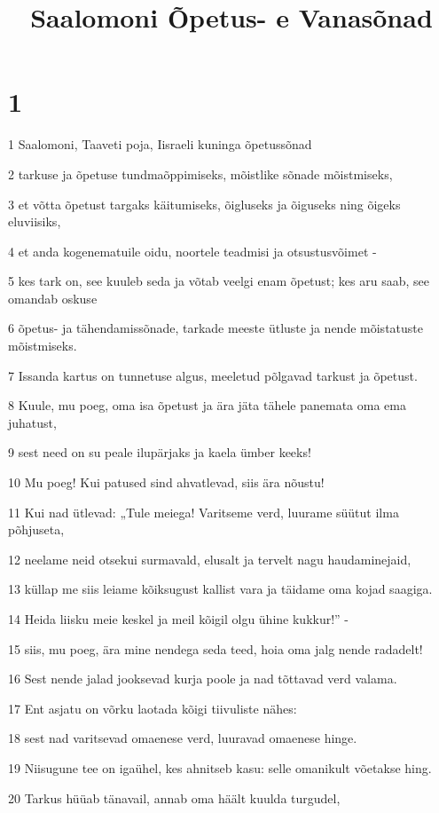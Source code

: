 

\title{Saalomoni Õpetus- e Vanasõnad}

\chapter{1}

\par 1 Saalomoni, Taaveti poja, Iisraeli kuninga õpetussõnad
\par 2 tarkuse ja õpetuse tundmaõppimiseks, mõistlike sõnade mõistmiseks,
\par 3 et võtta õpetust targaks käitumiseks, õigluseks ja õiguseks ning õigeks eluviisiks,
\par 4 et anda kogenematuile oidu, noortele teadmisi ja otsustusvõimet -
\par 5 kes tark on, see kuuleb seda ja võtab veelgi enam õpetust; kes aru saab, see omandab oskuse
\par 6 õpetus- ja tähendamissõnade, tarkade meeste ütluste ja nende mõistatuste mõistmiseks.
\par 7 Issanda kartus on tunnetuse algus, meeletud põlgavad tarkust ja õpetust.
\par 8 Kuule, mu poeg, oma isa õpetust ja ära jäta tähele panemata oma ema juhatust,
\par 9 sest need on su peale ilupärjaks ja kaela ümber keeks!
\par 10 Mu poeg! Kui patused sind ahvatlevad, siis ära nõustu!
\par 11 Kui nad ütlevad: „Tule meiega! Varitseme verd, luurame süütut ilma põhjuseta,
\par 12 neelame neid otsekui surmavald, elusalt ja tervelt nagu haudaminejaid,
\par 13 küllap me siis leiame kõiksugust kallist vara ja täidame oma kojad saagiga.
\par 14 Heida liisku meie keskel ja meil kõigil olgu ühine kukkur!” -
\par 15 siis, mu poeg, ära mine nendega seda teed, hoia oma jalg nende radadelt!
\par 16 Sest nende jalad jooksevad kurja poole ja nad tõttavad verd valama.
\par 17 Ent asjatu on võrku laotada kõigi tiivuliste nähes:
\par 18 sest nad varitsevad omaenese verd, luuravad omaenese hinge.
\par 19 Niisugune tee on igaühel, kes ahnitseb kasu: selle omanikult võetakse hing.
\par 20 Tarkus hüüab tänavail, annab oma häält kuulda turgudel,
